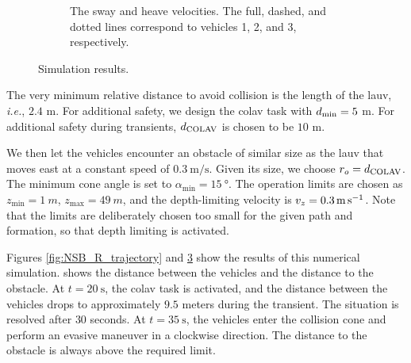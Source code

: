 \begin{figure}[p]
\begin{subfigure}[t]{0.475\textwidth}
        \label{fig:NSB_R_surge}
        \vspace{-2.5mm}
    \end{subfigure}
    \hspace{1em}
    \begin{subfigure}[t]{0.475\textwidth}
        \centering
        \hspace*{-1.3em}
        
        \vspace{-4mm}
        \caption{The sway and heave velocities. The full, dashed, and dotted lines correspond to vehicles 1, 2, and 3, respectively.}
        \label{fig:NSB_R_sway_heave}
        \vspace{-2.5mm}
    \end{subfigure}
    \caption{Simulation results.}
    \label{fig:NSB_R_results}    
\end{figure}

The very minimum relative distance to avoid collision is the length of the \gls{lauv}, \emph{i.e.}, $2.4$ m.
For additional safety, we design the \gls{colav} task with $d_{\rm min} = 5$ m.
For additional safety during transients, $d_{\rm COLAV}$ is chosen to be $10$ m.



We then let the vehicles encounter an obstacle of similar size as the \gls{lauv} that moves east at a constant speed of $\SI{0.3}{\meter\per\second}$.
Given its size, we choose $r_o = d_{\rm COLAV}$.
The minimum cone angle is set to $\alpha_{\min} = \SI{15}{\degree}$.
The operation limits are chosen as $z_{\min} = \SI{1}{m}$, $z_{\max} = \SI{49}{m}$, and the depth-limiting velocity is $v_z = \SI{0.3}{\meter\per\second}$.
Note that the limits are deliberately chosen too small for the given path and formation, so that depth limiting is activated.



Figures \ref{fig:NSB_R_trajectory} and \ref{fig:NSB_R_results} show the results of this numerical simulation.
 shows the distance between the vehicles and the distance to the obstacle.
At $t = \SI{20}{\second}$, the \gls{colav} task is activated, and the distance between the vehicles drops to approximately $9.5$ meters during the transient.
The situation is resolved after $30$ seconds.
At $t = \SI{35}{\second}$, the vehicles enter the collision cone and perform an evasive maneuver in a clockwise direction.
The distance to the obstacle is always above the required limit.



